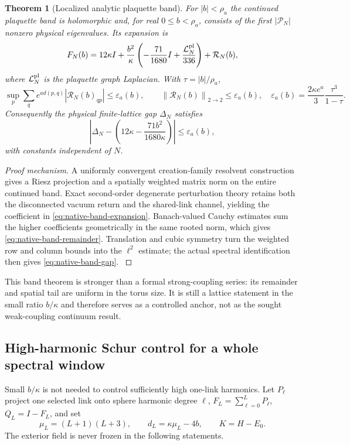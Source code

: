 \documentclass[11pt,oneside,openany]{book}
\newtheorem{theorem}{Theorem}[chapter]
\theoremstyle{definition}
\theoremstyle{remark}
\newcommand{\norm}[1]{\left\lVert#1\right\rVert}
\newcommand{\src}[2]{\cite[#2]{#1}}
\begin{document}
\begin{theorem}[Localized analytic plaquette band]
\label{thm:native-plaquette-band}
For $|b|<\rho_a$ the continued plaquette band is holomorphic and, for
real $0\le b<\rho_a$, consists of the first $|\mathcal P_N|$ nonzero
physical eigenvalues.  Its expansion is
\begin{equation}\label{eq:native-band-expansion}
 F_N(b)=12\kappa I+
 \frac{b^2}{\kappa}\left(-\frac{71}{1680}I+
                  \frac{\mathcal L_N^{\rm pl}}{336}\right)
 +\mathcal R_N(b),
\end{equation}
where $\mathcal L_N^{\rm pl}$ is the plaquette graph Laplacian.  With
$\tau=|b|/\rho_a$,
\begin{equation}\label{eq:native-band-remainder}
 \sup_p\sum_q e^{a d(p,q)}|\mathcal R_N(b)_{qp}|
 \le\varepsilon_a(b),\qquad
 \norm{\mathcal R_N(b)}_{2\to2}\le\varepsilon_a(b),
 \quad
 \varepsilon_a(b)=\frac{2\kappa e^a}{3}
                     \frac{\tau^3}{1-\tau}.
\end{equation}
Consequently the physical finite-lattice gap $\Delta_N$ satisfies
\begin{equation}\label{eq:native-band-gap}
 \left|\Delta_N-
 \left(12\kappa-\frac{71b^2}{1680\kappa}\right)\right|
 \le\varepsilon_a(b),
\end{equation}
with constants independent of $N$.
\end{theorem}
\begin{proof}[Proof mechanism]
A uniformly convergent creation-family resolvent construction gives a
Riesz projection and a spatially weighted matrix norm on the entire
continued band.  Exact second-order degenerate perturbation theory
retains both the disconnected vacuum return and the shared-link
channel, yielding the coefficient in
\cref{eq:native-band-expansion}.  Banach-valued Cauchy estimates sum the
higher coefficients geometrically in the same rooted norm, which gives
\cref{eq:native-band-remainder}.  Translation and cubic symmetry turn
the weighted row and column bounds into the $\ell^2$ estimate; the
actual spectral identification then gives
\cref{eq:native-band-gap}.  \src{F18}{V12}
\end{proof}

This band theorem is stronger than a formal strong-coupling series:
its remainder and spatial tail are uniform in the torus size.  It is
still a lattice statement in the small ratio $b/\kappa$ and therefore
serves as a controlled anchor, not as the sought weak-coupling
continuum result.

\subsection{High-harmonic Schur control for a whole spectral window}
Small $b/\kappa$ is not needed to control sufficiently high one-link
harmonics.  Let $P_\ell$ project one selected link onto sphere harmonic
degree $\ell$, $F_L=\sum_{\ell=0}^LP_\ell$, $Q_L=I-F_L$, and set
\begin{equation}\label{eq:native-high-dL}
 \mu_L=(L+1)(L+3),\qquad d_L=\kappa\mu_L-4b,
 \qquad K=H-E_0.
\end{equation}
The exterior field is never frozen in the following statements.
\end{document}

